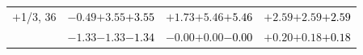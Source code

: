\documentclass[compress]{beamer}
\begin{document}
\begin{frame}
\begin{tabular}{r | c | c | c}
$+$1/3, 36 & $-0.49$\hspace{0.1 cm}$+3.55$\hspace{0.1 cm}\textcolor{black}{$+3.55$} & $+1.73$\hspace{0.1 cm}$+5.46$\hspace{0.1 cm}\textcolor{black}{$+5.46$} & $+2.59$\hspace{0.1 cm}$+2.59$\hspace{0.1 cm}\textcolor{black}{$+2.59$} \\
           & $-1.33$\hspace{0.1 cm}$-1.33$\hspace{0.1 cm}\textcolor{black}{$-1.34$} & $-0.00$\hspace{0.1 cm}$+0.00$\hspace{0.1 cm}\textcolor{black}{$-0.00$} & $+0.20$\hspace{0.1 cm}$+0.18$\hspace{0.1 cm}\textcolor{black}{$+0.18$} \\
\end{tabular}
\end{frame}
\end{document}
